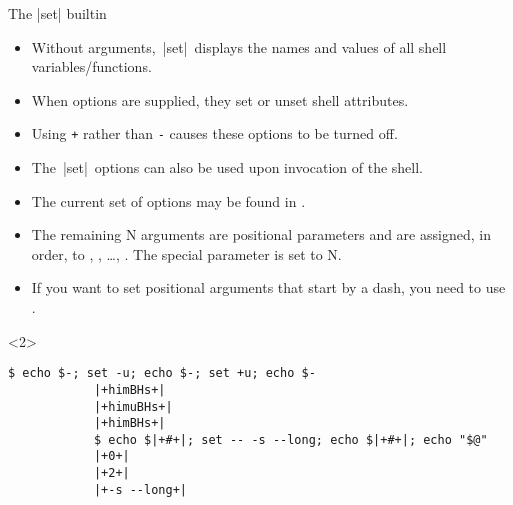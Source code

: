 \begin{frame}[fragile]{The \bash|set| builtin}{}
    \vspace{-4mm}
    \begin{itemize}
        \item Without arguments, \,\bash|set|\, displays the names and values of all shell variables/functions.
        \item When options are supplied, they set or unset shell attributes.
        \item Using \texttt{+} rather than \texttt{-} causes these options to be turned off.
        \item The \,\bash|set|\, options can also be used upon invocation of the shell.
        \item The current set of options may be found in \PB{\texttt{\$-}}.
        \item The remaining N arguments are positional parameters and are assigned, in order, to , , \ldots, .
              The special parameter \PB{\texttt{\#}} is set to N.
        \item If you want to set positional arguments that start by a dash, you need to use \PB{\texttt{-{}-}}.
    \end{itemize}
    \begin{uncoverenv}<2>
        \begin{lstlisting}[style=myBash, aboveskip=2mm]
            $ echo $-; set -u; echo $-; set +u; echo $-
            |+himBHs+|
            |+himuBHs+|
            |+himBHs+|
            $ echo $|+#+|; set -- -s --long; echo $|+#+|; echo "$@"
            |+0+|
            |+2+|
            |+-s --long+|
        \end{lstlisting}
    \end{uncoverenv}
\end{frame}
